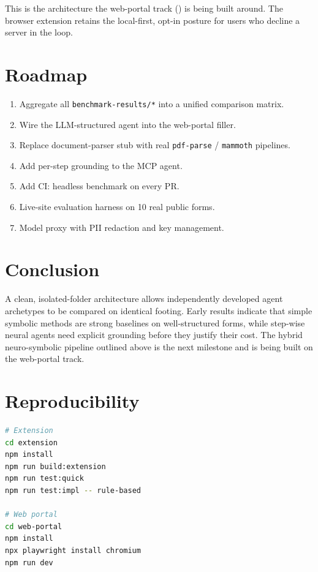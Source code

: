 \documentclass[conference]{IEEEtran}
\begin{document}
This is the architecture the web-portal track
() is being built around.
The browser extension retains the local-first, opt-in posture for users
who decline a server in the loop.

\section{Roadmap}
\begin{enumerate}
  \item Aggregate all \texttt{benchmark-results/*} into a unified
        comparison matrix.
  \item Wire the LLM-structured agent into the web-portal filler.
  \item Replace document-parser stub with real \texttt{pdf-parse} /
        \texttt{mammoth} pipelines.
  \item Add per-step grounding to the MCP agent.
  \item Add CI: headless benchmark on every PR.
  \item Live-site evaluation harness on 10 real public forms.
  \item Model proxy with PII redaction and key management.
\end{enumerate}

\section{Conclusion}
A clean, isolated-folder architecture allows independently developed
agent archetypes to be compared on identical footing. Early results
indicate that simple symbolic methods are strong baselines on
well-structured forms, while step-wise neural agents need explicit
grounding before they justify their cost. The hybrid neuro-symbolic
pipeline outlined above is the next milestone and is being built on the
web-portal track.

\section*{Reproducibility}
\begin{lstlisting}[language=bash]
# Extension
cd extension
npm install
npm run build:extension
npm run test:quick
npm run test:impl -- rule-based

# Web portal
cd web-portal
npm install
npx playwright install chromium
npm run dev
\end{lstlisting}
\end{document}

